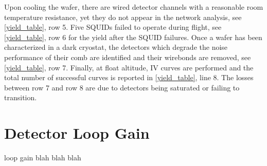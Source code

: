 Upon cooling the wafer, there are wired detector channels with a reasonable room temperature resistance, yet they do not appear in the network analysis, see \TAB\ref{yield_table}, row 5. Five \ac{SQUID}s failed to operate during flight, see \TAB\ref{yield_table}, row 6 for the yield after the \ac{SQUID} failures. 
Once a wafer has been characterized in a dark cryostat, the detectors which degrade the noise performance of their comb are identified and their wirebonds are removed, see \TAB\ref{yield_table}, row 7. 
Finally, at float altitude, IV curves are performed and the total number of successful curves is reported in \TAB\ref{yield_table}, line 8. The losses between row 7 and row 8 are due to detectors being saturated or failing to transition. %


\section{Detector Loop Gain}
\label{sec:loop_gain}

loop gain blah blah blah

